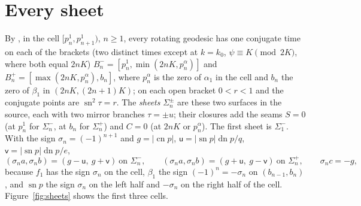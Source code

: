 \documentclass[11pt]{article}
\theoremstyle{remark}
\newcommand{\sn}{\operatorname{sn}}
\newcommand{\cn}{\operatorname{cn}}
\newcommand{\dn}{\operatorname{dn}}
\begin{document}
\section{Every sheet}\label{sec:every-sheet}

By \cite[Theorem 4.1]{SE2FirstConjugate}, in the cell $[p_n^1,p_{n+1}^1)$,
$n\ge1$, every rotating geodesic has one conjugate time on each of the brackets
(two distinct times except at $k=k_0$, $\psi\equiv K\pmod{2K}$,
where both equal $2nK$)
$B_n^-=[p_n^1,\min(2nK,p_n^\alpha)]$ and $B_n^+=[\max(2nK,p_n^\alpha),b_n]$,
where $p_n^\alpha$ is the zero of $\alpha_1$ in the cell and $b_n$ the
zero of $\beta_1$ in $(2nK,(2n+1)K)$; on each open bracket $0<r<1$ and
the conjugate points are $\sn^2\tau=r$.  The \emph{sheets} $\Sigma_n^\pm$
are these two surfaces in the source, each with two mirror branches
$\tau=\pm u$; their closures add the seams $S=0$ (at $p_n^1$ for
$\Sigma_n^-$, at $b_n$ for $\Sigma_n^+$) and $C=0$ (at $2nK$ or $p_n^\alpha$).
The first sheet is $\Sigma_1^-$.  With the sign
$\sigma_n=(-1)^{n+1}$ and $g=|\cn p|$, $\mathsf u=|\sn p|\dn p/q$, $\mathsf v=|\sn p|\dn p/e$,
\begin{equation}\label{eq:sheet-signs}
 (\sigma_na,\sigma_nb)=(g-\mathsf u,\ g+\mathsf v)\ \text{on }\Sigma_n^-,\qquad
 (\sigma_na,\sigma_nb)=(g+\mathsf u,\ g-\mathsf v)\ \text{on }\Sigma_n^+,\qquad \sigma_nc=-g,
\end{equation}
because $f_1$ has the sign $\sigma_n$ on the cell, $\beta_1$ the sign
$(-1)^n=-\sigma_n$ on $(b_{n-1},b_n)$, and $\sn p$ the sign $\sigma_n$ on
the left half and $-\sigma_n$ on the right half of the cell.  Figure~\ref{fig:sheets}
shows the first three cells.
\end{document}
